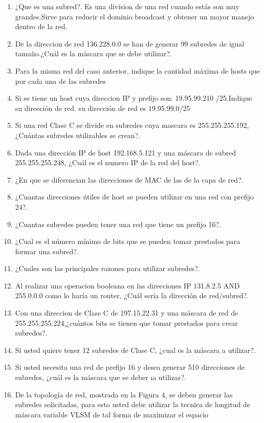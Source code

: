 \documentclass{udparticle}
\begin{document}
\begin{enumerate}
\item ¿Que es una subred?.
Es una division de una red cuando estás son muy grandes.Sirve para reducir el dominio broadcast y obtener un mayor manejo dentro
de la red.
\item De la direccion de red 136.228.0.0 se han de generar 99 subredes de igual tamaño.¿Cuál es la máscara que se debe utilizar?.
\item Para la misma red del caso anterior, indique la cantidad máxima de hosts que por cada una de las subredes
\item Si se tiene un host cuya direccion IP y prefijo son: 19.95.99.210 
/25.Indique su dirección de red.
su dirección de red es 19.95.99.0/25
\item Si una red Clase C se divide en subredes cuya mascara es 255.255.255.192, ¿Cuántas subredes utilizables se crean?.
\item Dada una dirección IP de host 192.168.5.121 y una máscara de 
subred 255.255.255.248, ¿Cuál es el numero IP de la red del host?.
\item ¿En que se diferencian las direcciones de MAC de las de la capa de red?.
\item ¿Cuantas direcciones útiles de host se pueden utilizar en una red con prefijo 24?.
\item ¿Cuantas subredes pueden tener una red que tiene un prefijo 16?.
\item ¿Cual es el número mínimo de bits que se pueden tomar prestados para formar una subred?.
\item ¿Cuales son las principales razones para utilizar subredes?.
\item Al realizar una operacion booleana en las direcciones IP 131.8.2.5
AND 255.0.0.0 como lo haría un router, ¿Cuál sería la dirección de 
red/subred?.
\item Con una direccion de Clase C de 197.15.22.31 y una máscara de red 
de 255.255.255.224,¿cuántos bits se tienen que tomar prestados para 
crear subredes?.
\item Si usted quiere tener 12 subredes de Clase C, ¿cual es la máscara 
a utilizar?.
\item Si usted necesita una red de prefijo 16 y desea generar 510 
direcciones de subredes, ¿cuál es la máscara que se deber ıa utilizar?.
\item De la topología de red, mostrada en la Figura 4, se deben generar 
las subredes solicitadas, para esto usted debe utilizar la tecnica de 
longitud de máscara variable VLSM de tal forma de maximizar el espacio 

\end{enumerate}
\end{document}
